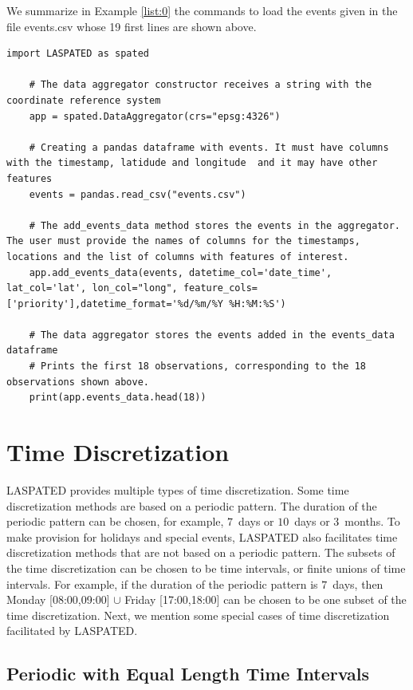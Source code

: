 \documentclass[article]{jss}
\begin{document}
{We summarize in Example \ref{list:0} the commands to load the events given in the file events.csv whose 19 first lines are shown above.

\begin{lstlisting}[label={list:0},caption=Building a data aggregator and adding events]
    import LASPATED as spated
    
    # The data aggregator constructor receives a string with the coordinate reference system
    app = spated.DataAggregator(crs="epsg:4326")

    # Creating a pandas dataframe with events. It must have columns with the timestamp, latidude and longitude  and it may have other features
    events = pandas.read_csv("events.csv")

    # The add_events_data method stores the events in the aggregator. The user must provide the names of columns for the timestamps, locations and the list of columns with features of interest.
    app.add_events_data(events, datetime_col='date_time', lat_col='lat', lon_col="long", feature_cols=['priority'],datetime_format='%d/%m/%Y %H:%M:%S')

    # The data aggregator stores the events added in the events_data dataframe
    # Prints the first 18 observations, corresponding to the 18 observations shown above.
    print(app.events_data.head(18))
\end{lstlisting}
}



\section{Time Discretization}
\label{sec:timedis}

LASPATED provides multiple types of time discretization.
Some time discretization methods are based on a periodic pattern.
The duration of the periodic pattern can be chosen, for example, $7$~days or $10$~days or $3$~months.
To make provision for holidays and special events, LASPATED also facilitates time discretization methods that are not based on a periodic pattern.
The subsets of the time discretization can be chosen to be time intervals, or finite unions of time intervals.
For example, if the duration of the periodic pattern is $7$~days, then Monday [08:00,09:00] $\cup$ Friday [17:00,18:00] can be chosen to be one subset of the time discretization.
Next, we mention some special cases of time discretization facilitated by LASPATED.


\subsection{Periodic with Equal Length Time Intervals}
\end{document}
